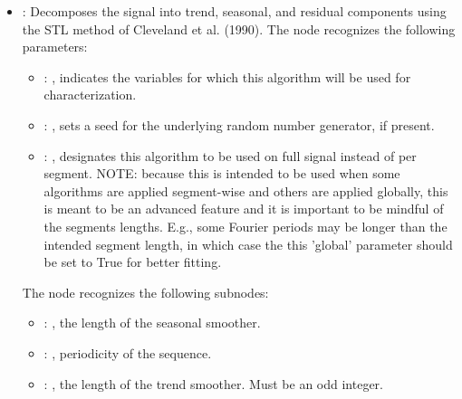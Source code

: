 \begin{itemize}
    \item {}:
       Decomposes the signal into trend, seasonal, and residual components using the STL method of
      Cleveland et al. (1990).
      The  node recognizes the following parameters:
        \begin{itemize}
          \item {}: , 
            indicates the variables for which this algorithm will be used for characterization.
          \item {}: , 
            sets a seed for the underlying random number generator, if present.
          \item {}: , 
            designates this algorithm to be used on full signal instead of per
            segment. NOTE: because this is intended to be used when some algorithms are
            applied segment-wise and others are applied globally, this is meant to be an
            advanced feature and it is important to be mindful of the segments lengths.
            E.g., some Fourier periods may be longer than the intended segment length, in
            which case the this 'global' parameter should be set to True for better
            fitting. 
      \end{itemize}

      The  node recognizes the following subnodes:
      \begin{itemize}
        \item {}: , 
          the length of the seasonal smoother.

        \item {}: , 
          periodicity of the sequence.

        \item {}: , 
          the length of the trend smoother. Must be an odd integer.
      \end{itemize}


\end{itemize}
